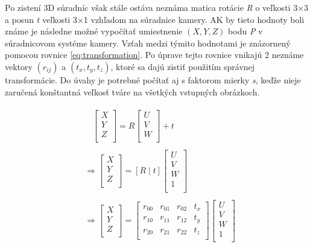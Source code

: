 \documentclass[slovak,master,dept460,male,cpp,cpdeclaration]{diploma}
\begin{document}
Po zistení 3D súradníc však stále ostáva neznáma matica rotácie \textit{R} o veľkosti 3$\times$3 a posun  \textit{t} veľkosti 3$\times$1 vzhľadom na súradnice kamery. AK by tieto hodnoty boli známe je následne možné vypočítať umiestnenie $(X, Y, Z)$ bodu \textit{P} v súradnicovom systéme kamery. Vzťah medzi týmito hodnotami je znázornený pomocou rovnice \ref{eq:transformation}. Po úprave tejto rovnice vnikajú 2 neznáme vektory $(r_{ij})$ a $(t_{x},t_{y},t_{z})$, ktoré sa dajú zistiť použitím správnej transformácie. Do úvahy je potrebné počítať aj s faktorom mierky \textit{s}, keďže nieje zaručená konštantná veľkosť tváre na všetkých vstupných obrázkoch.


\begin{eqnarray}
\begin{split}
&\ \ \ \ \begin{bmatrix}
X\\ 
Y\\ 
Z\\
\end{bmatrix}
= R
\begin{bmatrix}
U\\ 
V\\ 
W\\ 
\end{bmatrix}
+ t
\\
\\
&\Rightarrow
\begin{bmatrix}
X\\ 
Y\\ 
Z\\
\end{bmatrix}
= \left[R \mid t\right]
\begin{bmatrix}
U\\ 
V\\ 
W\\
1\\
\end{bmatrix}
\\
\\
&\Rightarrow
\begin{bmatrix}
X\\ 
Y\\ 
Z\\
\end{bmatrix}
=
\begin{bmatrix}
r_{00} & r_{01} & r_{02} & t_{x}\\ 
r_{10} & r_{11} & r_{12} & t_{y}\\ 
r_{20} & r_{21} & r_{22} & t_{z}\\
\end{bmatrix}
\begin{bmatrix}
U\\ 
V\\ 
W\\
1\\
\end{bmatrix}
\label{eq:transformation}
\end{split}
\end{eqnarray}
\end{document}
